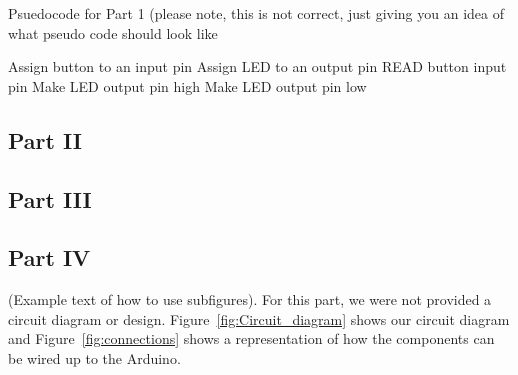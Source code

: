\documentclass[journal]{IEEEtran}
\begin{document}
\begin{algorithm}
\caption{Psuedocode for Part 1 (please note, this is not correct, just giving you an idea of what pseudo code should look like}\label{alg:part1}
\begin{algorithmic}[1]
\State Assign button to an input pin
\State Assign LED to an output pin
\State READ button input pin
    \State Make LED output pin high
\Else
    \State Make LED output pin low
\EndIf 
\end{algorithmic}
\end{algorithm}

\subsection{Part II}
\subsection{Part III}
\subsection{Part IV}
(Example text of how to use subfigures). For this part, we were not provided a circuit diagram or design. Figure~\ref{fig:Circuit_diagram} shows our circuit diagram and Figure~\ref{fig:connections} shows a representation of how the components can be wired up to the Arduino.
\end{document}

